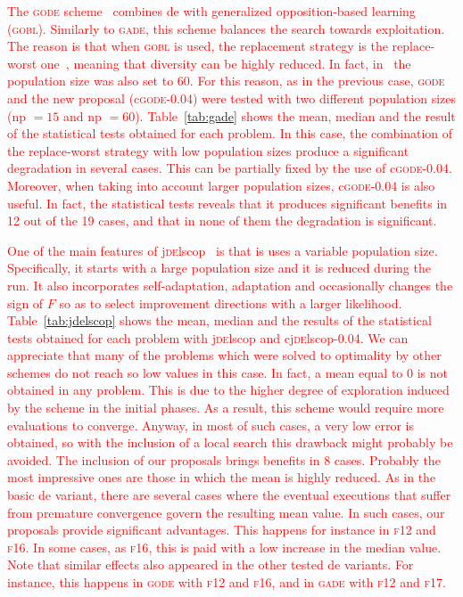 \documentclass[preprint,3p]{elsarticle}
\newcommand{\DE}{{\sc de}}
\newcommand{\NP}{{\sc np}}
\begin{document}


\textcolor{red}{
The \textsc{gode} scheme~\cite{Wang:11b} combines \DE{} with generalized opposition-based learning (\textsc{gobl}).
%
Similarly to \textsc{gade}, this scheme balances the search towards exploitation.
%
The reason is that when \textsc{gobl} is used, the replacement strategy is the replace-worst one~\cite{Eiben:03}, meaning that diversity can be highly reduced.
%
In fact, in~\cite{Wang:11b} the population size was also set to 60.
%
For this reason, as in the previous case, \textsc{gode} and the new proposal (c\textsc{gode-0.04}) were tested
with two different population sizes (\NP{} $= 15$ and \NP{} $= 60$).
%
Table~\ref{tab:gade} shows the mean, median and the result of the statistical tests obtained for each problem.
%
In this case, the combination of the replace-worst strategy with low population sizes produce a significant degradation in several cases.
%
This can be partially fixed by the use of c\textsc{gode-0.04}.
%
Moreover, when taking into account larger population sizes, c\textsc{gode-0.04} is also useful.
%
In fact, the statistical tests reveals that it produces significant benefits in 12 out of the 19 cases, and that in none
of them the degradation is significant.
}



\textcolor{red}{
One of the main features of j\textsc{de}lscop~\cite{Brest:11} is that is uses a variable population size.
%
Specifically, it starts with a large population size and it is reduced during the run.
%
It also incorporates self-adaptation, adaptation and occasionally changes the sign of $F$ so as to select improvement directions with a larger
likelihood.
%
Table~\ref{tab:jdelscop} shows the mean, median and the results of the statistical tests obtained for each problem with j\textsc{de}lscop and cj\textsc{de}lscop-0.04.
%
We can appreciate that many of the problems which were solved to optimality by other schemes do not reach so low values in this case.
%
In fact, a mean equal to 0 is not obtained in any problem.
%
This is due to the higher degree of exploration induced by the scheme in the initial phases.
%
As a result, this scheme would require more evaluations to converge.
%
Anyway, in most of such cases, a very low error is obtained, so with the inclusion of a local search this drawback might probably be avoided.
%
The inclusion of our proposals brings benefits in 8 cases.
%
Probably the most impressive ones are those in which the mean is highly reduced.
%
As in the basic \DE{} variant, there are several cases where the eventual executions that suffer from premature convergence 
govern the resulting mean value.
%
In such cases, our proposals provide significant advantages.
%
This happens for instance in \textsc{f12} and \textsc{f16}.
%
In some cases, as \textsc{f16}, this is paid with a low increase in the median value.
%
Note that similar effects also appeared in the other tested \DE{} variants.
%
For instance, this happens in \textsc{gode} with \textsc{f12} and \textsc{f16}, and in \textsc{gade} with \textsc{f12} and \textsc{f17}.
}
\end{document}
